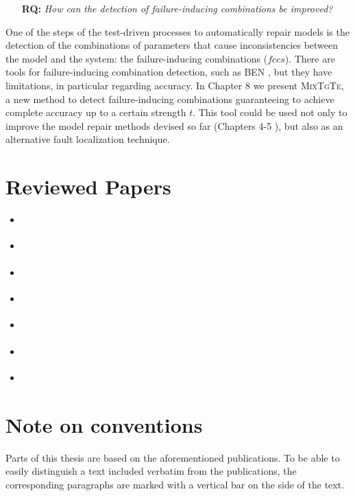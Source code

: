 \documentclass[
12pt, %
oneside, %
english, %
singlespacing, %
headsepline, %
consistentlayout, %
]{MastersDoctoralThesis} %
\newcommand{\fccs}{\ensuremath{\mathit{fccs}}\xspace}
\newcommand{\mix}{\textsc{MixTgTe}\xspace}
\newcounter{researchquestionCount}
\newcommand{\researchquestion}[1]{\stepcounter{researchquestionCount}\begin{itemize}\item [\textbf{RQ\arabic{researchquestionCount}:}] \emph{#1}\end{itemize}}
\theoremstyle{plain}
\theoremstyle{definition}
\theoremstyle{remark}
\theoremstyle{plain}
\theoremstyle{plain}
\theoremstyle{remark}
\begin{document}
\researchquestion{How can the detection of failure-inducing combinations be improved?}
One of the steps of the test-driven processes to automatically repair models is the detection of the combinations of parameters that cause inconsistencies between the model and the system: the failure-inducing combinations (\fccs).
There are tools for failure-inducing combination detection, such as BEN \cite{ben_2015} , but they have limitations, in particular regarding accuracy.
In Chapter 8 we present \mix, a new method to detect failure-inducing combinations guaranteeing to achieve complete accuracy up to a certain strength $t$.
This tool could be used not only to improve the model repair methods devised so far (Chapters 4-5 ), but also as an alternative fault localization technique.
	

\section{Reviewed Papers}
\begin{itemize}
	\item \cite{gargantini_combinatorial_2017} 
	
	\item \cite{arcainiAchieving} 
	
	\item \cite{arcaini2018evolutionary} 
	
	\item \cite{IWCTGargantini2018} 
	
	\item \cite{Gargantini16:validation} 
	
	\item \cite{evolUpdateVAMOS2018} 
	
	\item \cite{arcaini2019varivolution} 

\end{itemize}

\section{Note on conventions}
Parts of this thesis are based on the aforementioned publications. To be able to easily distinguish a text included verbatim from the publications, the corresponding paragraphs are marked with a vertical bar on the side of the text.
\end{document}
